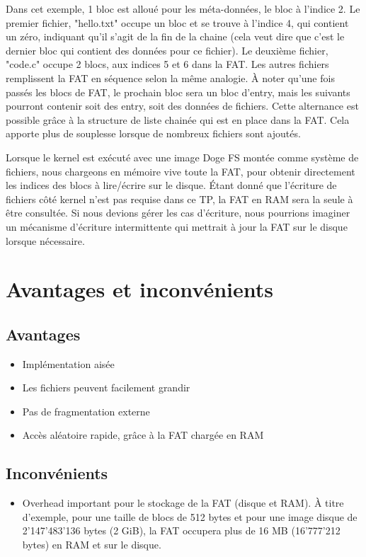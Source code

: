 \documentclass[a4paper, 12pt]{article}
\begin{document}
Dans cet exemple, 1 bloc est alloué pour les méta-données, le bloc à l'indice 2. 
Le premier fichier, "hello.txt" occupe un bloc et se trouve à l'indice 4, qui contient un zéro, indiquant 
qu'il s'agit de la fin de la chaine (cela veut dire que c'est le dernier bloc qui contient des données pour
ce fichier). Le deuxième fichier, "code.c" occupe 2 blocs, aux indices 5 et 6 dans la FAT.
Les autres fichiers remplissent la FAT en séquence selon la même analogie.
À noter qu'une fois passés les blocs de FAT, le prochain bloc sera un bloc d'entry, mais les suivants pourront
contenir soit des entry, soit des données de fichiers. Cette alternance est possible grâce à la structure 
de liste chainée qui est en place dans la FAT. Cela apporte plus de souplesse lorsque de nombreux fichiers 
sont ajoutés.
\bigbreak

Lorsque le kernel est exécuté avec une image Doge FS montée comme système de fichiers, nous chargeons en 
mémoire vive toute la FAT, pour obtenir directement les indices des blocs à lire/écrire sur le disque. Étant 
donné que l'écriture de fichiers côté kernel n'est pas requise dans ce TP, la FAT en RAM sera la seule à être 
consultée. Si nous devions gérer les cas d'écriture, nous pourrions imaginer un mécanisme d'écriture intermittente
qui mettrait à jour la FAT sur le disque lorsque nécessaire.

\section{Avantages et inconvénients}
\subsection{Avantages}
\begin{itemize}
	\item Implémentation aisée
	\item Les fichiers peuvent facilement grandir
	\item Pas de fragmentation externe
	\item Accès aléatoire rapide, grâce à la FAT chargée en RAM
\end{itemize}
\subsection{Inconvénients}
\begin{itemize}
	\item Overhead important pour le stockage de la FAT (disque et RAM). À titre d'exemple, pour une taille de 
	blocs de 512 bytes et pour une image disque de 2'147'483'136 bytes (2 GiB), la FAT occupera plus de 16 MB 
	(16'777'212 bytes) en RAM et sur le disque.
\end{itemize}
\end{document}
